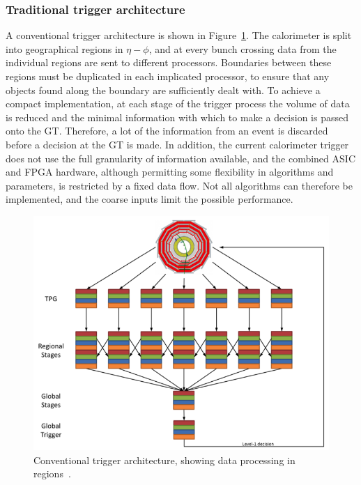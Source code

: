 \subsubsection{Traditional trigger architecture}
A conventional trigger architecture is shown in Figure~\ref{fig:tradTrig}.
The calorimeter is split into geographical regions in $\eta-\phi$, 
and at every bunch crossing data from the individual regions are sent to different processors.
Boundaries between these regions must be duplicated in each implicated processor, to ensure that any objects found along the boundary are sufficiently dealt with.
To achieve a compact implementation, at each stage of the trigger process the volume of data is reduced and the minimal information with which to make a decision is passed onto the \ac{GT}. 
Therefore, a lot of the information from an event is discarded before a decision at the \ac{GT} is made.
In addition, the current calorimeter trigger does not use the full granularity of information available, and the combined \ac{ASIC} and \ac{FPGA} hardware, although permitting some flexibility in algorithms and parameters, is restricted by a fixed data flow. 
Not all algorithms can therefore be implemented, and the coarse inputs limit the possible performance.

\begin{figure}[h!]
\begin{center}
  \includegraphics[scale=0.78]{Figures/l1jets/TraditionalTrigger.png}
\caption{Conventional trigger architecture, showing data processing in regions~\cite{RoseTrig}.}
\label{fig:tradTrig}
\end{center}
\end{figure}


